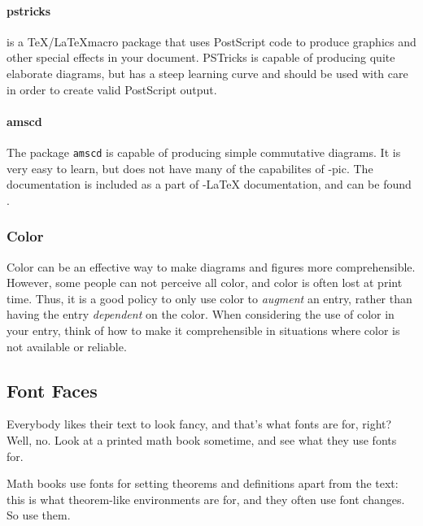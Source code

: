 \paragraph{pstricks}
is a \TeX/\LaTeX macro package that uses PostScript code to produce
graphics and other special effects in your document. PSTricks is
capable of producing quite elaborate diagrams, but has a steep learning
curve and should be used with care in order to create valid PostScript
output.

\paragraph{amscd}
The package \texttt{amscd} is capable of producing simple commutative diagrams. It is very easy to learn, but does not have many of the capabilites of \Xy-pic. The documentation is included as a part of \AmS-\LaTeX{} documentation, and can be found .

\subsubsection{Color}
Color can be an effective way to make diagrams and figures more comprehensible. However, some people can not perceive all color, and color is often lost at print time. Thus, it is a good policy to only use color to \emph{augment} an entry, rather than having the entry \emph{dependent} on the color. When considering the use of color in your entry, think of how to make it comprehensible in situations where color is not available or reliable.


\subsection{Font Faces\label{sec:font-faces}}

Everybody likes their text to look fancy, and that's what fonts are for, right? Well, no. Look at a printed math book sometime, and see what they use fonts for.

Math books use fonts for setting theorems and definitions apart from the text: this is what theorem-like environments are for, and they often use font changes. So use them.

